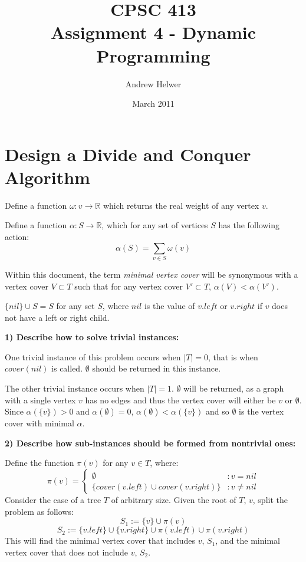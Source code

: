 \documentclass{article}
\begin{document}
\title{CPSC 413 \\ Assignment 4 - Dynamic Programming}
\author{Andrew Helwer}
\date{March 2011}
\maketitle

\section{Design a Divide and Conquer Algorithm}

Define a function $\omega:v \rightarrow \mathbb{R}$ which returns the real
weight of any vertex $v$.

Define a function $\alpha:S \rightarrow \mathbb{R}$, which for
any set of vertices $S$ has the following action:
\begin{equation*}
\alpha(S) = \sum_{v \in S} \omega(v)
\end{equation*}

Within this document, the term \textit{minimal vertex cover} will be synonymous
with a vertex cover $V \subset T$ such that for any vertex cover $V'
\subset T$, $\alpha(V) < \alpha(V')$.

$\{nil\} \cup S = S$ for any set $S$, where $nil$ is the value of $v.left$ or
$v.right$ if $v$ does not have a left or right child.

\textbf{1) Describe how to solve trivial instances:}

One trivial instance of this problem occurs when $|T| = 0$, that is when
$cover(nil)$ is called. $\emptyset$ should be returned in this instance.

The other trivial instance occurs when $|T| = 1$. $\emptyset$
will be returned, as a graph with a single vertex $v$ has no edges and thus the
vertex cover will either be $v$ or $\emptyset$. Since $\alpha(\{v\}) > 0$ and
$\alpha(\emptyset) = 0$, $\alpha(\emptyset) < \alpha(\{v\})$ and so $\emptyset$
is the vertex cover with minimal $\alpha$.

\textbf{2) Describe how sub-instances should be formed from nontrivial ones:}

Define the function $\pi(v)$ for any $v \in T$, where:
\begin{displaymath}
\pi(v) = \left\{
	\begin{array}{lr}
	\emptyset & : v = nil \\
	\{cover(v.left) \cup cover(v.right)\} & : v \neq nil
	\end{array}
	\right.
\end{displaymath} 
Consider the case of a tree $T$ of arbitrary size. Given the root of $T$, $v$,
split the problem as follows:
\begin{equation*}
S_1 := \{v\} \cup \pi(v)
\end{equation*}
\begin{equation*}
S_2 := \{v.left\} \cup \{v.right\} \cup \pi(v.left) \cup \pi(v.right)
\end{equation*}
This will find the minimal vertex cover that includes $v$, $S_1$, and the
minimal vertex cover that does not include $v$, $S_2$.
\end{document}
